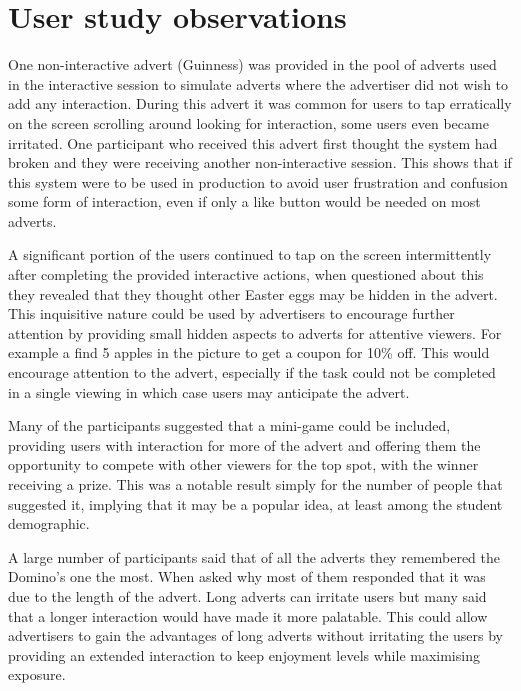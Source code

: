 \section{User study observations}
\begin{enumerate}
One non-interactive advert (Guinness) was provided in the pool of adverts used in the interactive session to simulate adverts where the advertiser did not wish to add any interaction. During this advert it was common for users to tap erratically on the screen scrolling around looking for interaction, some users even became irritated. One participant who received this advert first thought the system had broken and they were receiving another non-interactive session. This shows that if this system were to be used in production to avoid user frustration and confusion some form of interaction, even if only a like button would be needed on most adverts.

A significant portion of the users continued to tap on the screen intermittently after completing the provided interactive actions, when questioned about this they revealed that they thought other Easter eggs may be hidden in the advert. This inquisitive nature could be used by advertisers to encourage further attention by providing small hidden aspects to adverts for attentive viewers. For example a find 5 apples in the picture to get a coupon for 10\% off. This would encourage attention to the advert, especially if the task could not be completed in a single viewing in which case users may anticipate the advert.

Many of the participants suggested that a mini-game could be included, providing users with interaction for more of the advert and offering them the opportunity to compete with other viewers for the top spot, with the winner receiving a prize. This was a notable result simply for the number of people that suggested it, implying that it may be a popular idea, at least among the student demographic.

A large number of participants said that of all the adverts they remembered the Domino's one the most. When asked why most of them responded that it was due to the length of the advert. Long adverts can irritate users but many said that a longer interaction would have made it more palatable. This could allow advertisers to gain the advantages of long adverts without irritating the users by providing an extended interaction to keep enjoyment levels while maximising exposure.
\end{enumerate}